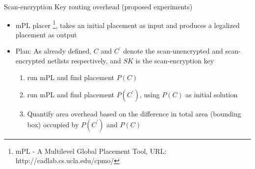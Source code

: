 \begin{frame}{Scan-encryption Key routing overhead (proposed experiments)}
\begin{itemize}
\item mPL placer \footnote{mPL - A Multilevel Global Placement Tool, URL: http://cadlab.cs.ucla.edu/cpmo/}, takes an initial placement as input and produces a legalized placement as output
\item \alert{Plan}: As already defined, $C$ and $C^{'}$ denote the scan-unencrypted and scan-encrypted netlists respectively, and $SK$ is the scan-encryption key 
\begin{enumerate}
\item run mPL and find placement $P(C)$
\item run mPL and find placement $P(C^{'})$, using $P(C)$ as initial solution
\item Quantify area overhead based on the difference in total area (bounding box) occupied by $P(C^{'})$ and $P(C)$
\end{enumerate}
\end{itemize}
\end{frame}
